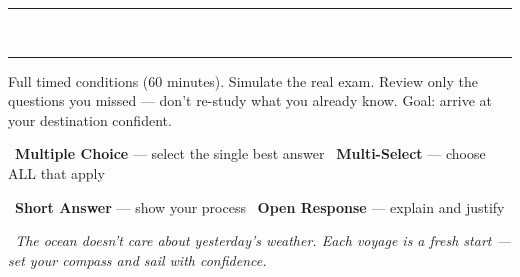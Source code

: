 {\vspace{1mm}
\begin{center}
    \textcolor{navGold!30}{\rule{0.3\linewidth}{0.4pt}}
    \textcolor{navGold!50}{~\faAngleDoubleDown~}
    \textcolor{navGold!30}{\rule{0.3\linewidth}{0.4pt}}
\end{center}
\vspace{1mm}

\noindent
\begin{tcolorbox}[
    enhanced,
    colback=navDeep!5,
    colframe=navDeep!45,
    arc=4pt, boxrule=1.5pt,
    left=5mm, right=5mm, top=3mm, bottom=3mm,
    title={\textcolor{white}{Voyage III: Charted Mastery (Tests 5--6)}},
    colbacktitle=navDeep!80,
    fonttitle=\bfseries\sffamily,
    borderline west={3pt}{0pt}{navDeep!60},
]
    \small
    Full timed conditions (60 minutes). Simulate the real exam.
    Review only the questions you missed --- don't re-study
    what you already know. Goal: arrive at your destination confident.
\end{tcolorbox}

\vspace{3mm}

\begin{tcolorbox}[
    enhanced,
    colback=navSand,
    colframe=navDeep!30,
    arc=6pt, boxrule=0.8pt,
    left=5mm, right=5mm, top=3mm, bottom=3mm,
    title={\small\textcolor{white}{\faClipboardList~Cargo Manifest}},
    colbacktitle=navDeep!65,
    fonttitle=\bfseries\sffamily,
]
    \small
    \textcolor{navTeal}{\faAnchor}~\textbf{Multiple Choice} --- select the single best answer\hfill
    \textcolor{navGold!80!black}{\faAnchor}~\textbf{Multi-Select} --- choose ALL that apply

    \smallskip
    \textcolor{navDeep}{\faAnchor}~\textbf{Short Answer} --- show your process\hfill
    \textcolor{navStorm}{\faAnchor}~\textbf{Open Response} --- explain and justify
\end{tcolorbox}

\vspace{3mm}

\begin{tcolorbox}[
    enhanced,
    colback=navWave,
    colframe=navTeal!25,
    arc=6pt, boxrule=0.8pt,
    left=5mm, right=5mm, top=3mm, bottom=3mm,
]
    \begin{minipage}[c]{0.07\linewidth}
        \centering \iconOwl[1cm]
    \end{minipage}%
    \hfill
    \begin{minipage}[c]{0.90\linewidth}
        \small\itshape\color{navDeep}
        \faQuoteLeft~The ocean doesn't care about yesterday's weather.
        Each voyage is a fresh start --- set your compass
        and sail with confidence.~\faQuoteRight
    \end{minipage}
\end{tcolorbox}

}

\newpage

